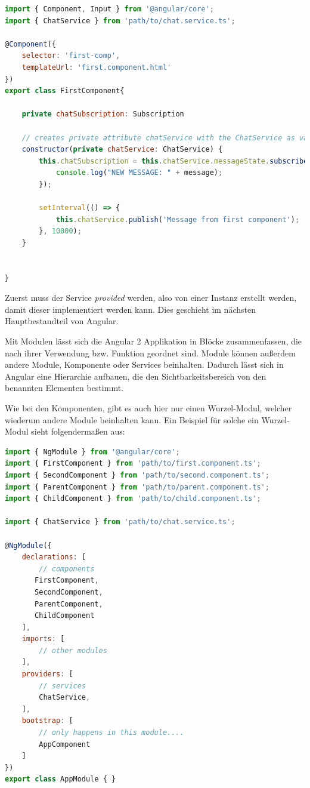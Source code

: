 \lstset{escapechar=?,style=customjava}
\begin{lstlisting}[language=javascript, caption=Beispiel von Service-Implementierung (\textit{first.component.ts} - Datei)]
import { Component, Input } from '@angular/core';
import { ChatService } from 'path/to/chat.service.ts';

@Component({
	selector: 'first-comp',
	templateUrl: 'first.component.html'
})
export class FirstComponent{

    private chatSubscription: Subscription
    
    // creates private attribute chatService with the ChatService as value.
    constructor(private chatService: ChatService) {
        this.chatSubscription = this.chatService.messageState.subscribe((message) => {
            console.log("NEW MESSAGE: " + message);
        });
        
        setInterval(() => {
            this.chatService.publish('Message from first component');
        }, 10000);
    }
    
    
}
\end{lstlisting}
\lstset{escapechar=@,style=customjava}

Zuerst muss der Service \textit{provided} werden, also von einer Instanz erstellt werden, damit dieser implementiert werden kann. Dies geschieht im nächsten Hauptbestandteil von Angular.

\clearpage
{}
Mit Modulen lässt sich die Angular 2 Applikation in Blöcke zusammenfassen, die nach ihrer Verwendung bzw. Funktion geordnet sind. Module können außerdem andere Module, Komponente oder Services beinhalten. Dadurch lässt sich in Angular eine Hierarchie aufbauen, die den Sichtbarkeitsbereich von den benannten Elementen bestimmt.

Wie bei den Komponenten, gibt es auch hier nur einen Wurzel-Modul, welcher wiederum andere Module beinhalten kann. Ein Beispiel für solche ein Wurzel-Modul sieht folgendermaßen aus:

\lstset{escapechar=?,style=customjava}
\begin{lstlisting}[language=javascript, caption=Beispiel von einem Modul (\textit{app.module.ts} - Datei)]
import { NgModule } from '@angular/core';
import { FirstComponent } from 'path/to/first.component.ts';
import { SecondComponent } from 'path/to/second.component.ts';
import { ParentComponent } from 'path/to/parent.component.ts';
import { ChildComponent } from 'path/to/child.component.ts';

import { ChatService } from 'path/to/chat.service.ts';

@NgModule({
    declarations: [
        // components
       FirstComponent,
       SecondComponent,
       ParentComponent,
       ChildComponent
    ],
    imports: [ 
        // other modules
    ],
    providers: [ 
        // services
        ChatService,
    ],
    bootstrap: [
        // only happens in this module....
        AppComponent
    ]
})
export class AppModule { }
\end{lstlisting}
\lstset{escapechar=@,style=customjava}

